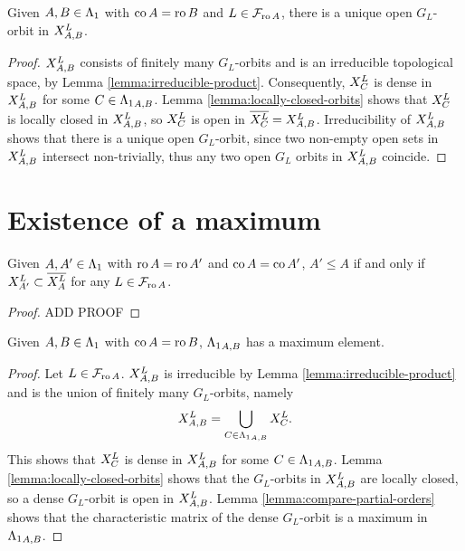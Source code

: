 \documentclass[a4paper, 11pt]{report}
\begin{document}
\begin{proposition}\label{prop:open-orbits-in-product}
Given $A,B\in\matrices$ with $\co{A}=\ro{B}$ and $L\in\flags_{\ro{A}}$, there is a unique open $G_L$-orbit in $\xprod[L]{A,B}$.
\end{proposition}

\begin{proof}
$\xprod[L]{A,B}$ consists of finitely many $G_L$-orbits and is an irreducible topological space, by Lemma \ref{lemma:irreducible-product}. Consequently, $\xprod[L]{C}$ is dense in $\xprod[L]{A,B}$ for some $C\in\matrices_{A,B}$. Lemma \ref{lemma:locally-closed-orbits} shows that $\xprod[L]{C}$ is locally closed in $\xprod[L]{A,B}$, so $\xprod[L]{C}$ is open in $\overline{\xprod[L]{C}}=\xprod[L]{A,B}$. Irreducibility of $\xprod[L]{A,B}$ shows that there is a unique open $G_L$-orbit, since two non-empty open sets in $\xprod[L]{A,B}$ intersect non-trivially, thus any two open $G_L$ orbits in $\xprod[L]{A,B}$ coincide.
\end{proof}

\section{Existence of a maximum}

\begin{lemma}\label{lemma:compare-partial-orders}
Given $A,A'\in\matrices$ with $\ro{A}=\ro{A'}$ and $\co{A}=\co{A'}$, $A'\le A$ if and only if $\xprod[L]{A'}\subset\overline{\xprod[L]{A}}$ for any $L\in\flags_{\ro{A}}$.
\end{lemma}

\begin{proof}
{\color{red}ADD PROOF}
\end{proof}

\begin{proposition}\label{proposition:existence}
Given $A,B\in\matrices$ with $\co{A}=\ro{B}$, $\matrices_{A,B}$ has a maximum element.
\end{proposition}

\begin{proof}
Let $L\in\flags_{\ro{A}}$. $\xprod[L]{A,B}$ is irreducible by Lemma \ref{lemma:irreducible-product} and is the union of finitely many $G_L$-orbits, namely
\begin{equation*}
\xprod[L]{A,B} = \bigcup_{C\in\matrices_{A,B}} \xprod[L]{C}.
\end{equation*}
This shows that $\xprod[L]{C}$ is dense in $\xprod[L]{A,B}$ for some $C\in\matrices_{A,B}$. Lemma \ref{lemma:locally-closed-orbits} shows that the $G_L$-orbits in $\xprod[L]{A,B}$ are locally closed, so a dense $G_L$-orbit is open in $\xprod[L]{A,B}$. Lemma \ref{lemma:compare-partial-orders} shows that the characteristic matrix of the dense $G_L$-orbit is a maximum in $\matrices_{A,B}$.
\end{proof}
\end{document}
